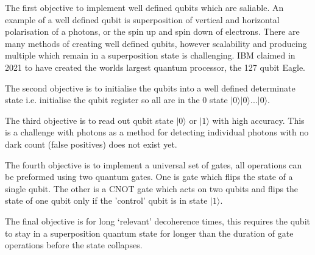 The first objective to implement well defined qubits which are saliable. An example of a well defined qubit is superposition of vertical and horizontal polarisation of a photons, or the spin up and spin down of electrons. 
There are many methods of creating well defined qubits, however scalability and producing multiple which remain in a superposition state is challenging.
IBM claimed in 2021 to have created the worlds largest quantum processor, the 127 qubit Eagle. \cite{authorfullname_ibm_nodate}
\vspace{1em}

The second objective is to initialise the qubits into a well defined determinate state i.e. initialise the qubit register so all are in the 0 state $\vert 0\rangle \vert 0\rangle$...$\vert 0 \rangle$. \cite{lapierre_divincenzo_2021}
\vspace{1em}

The third objective is to read out qubit state $\vert 0\rangle$ or $\vert 1 \rangle$ with high accuracy. 
This is a challenge with photons as a method for detecting individual photons with no dark count (false positives) does not exist yet.
\vspace{1em}

The fourth objective is to implement a universal set of gates, all operations can be preformed using two quantum gates.
One is gate which flips the state of a single qubit. The other is a CNOT gate which acts on two qubits and flips the state of one qubit only if the 'control' qubit is in state $\vert 1 \rangle$. \cite{lapierre_divincenzo_2021} 
\vspace{1em}

The final objective is for long `relevant' decoherence times, this requires the qubit to stay in a superposition quantum state for longer than the duration of gate operations before the state collapses. 
